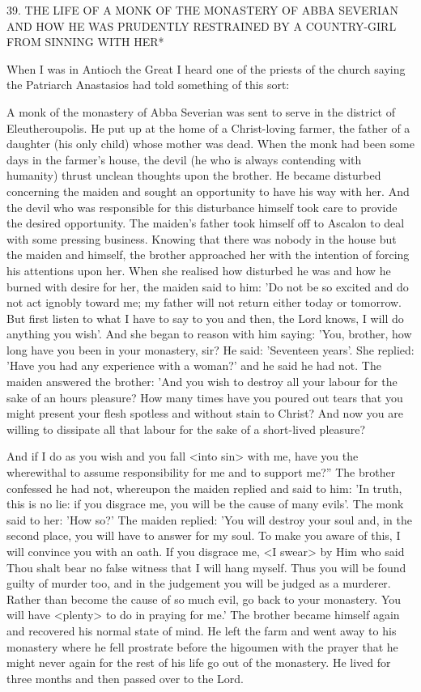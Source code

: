 39.
THE LIFE OF A MONK OF THE MONASTERY OF
ABBA SEVERIAN AND HOW HE WAS PRUDENTLY
RESTRAINED BY A COUNTRY-GIRL
FROM SINNING WITH HER*

When I was in Antioch the Great I heard one of the priests of the
church saying the Patriarch Anastasios had told something of this
sort:

A monk of the monastery of Abba Severian was sent to serve in the
district of Eleutheroupolis.
He put up at the home of a Christ-loving
farmer, the father of a daughter (his only child) whose mother was
dead.
When the monk had been some days in the farmer's house,
the devil (he who is always contending with humanity) thrust
unclean thoughts upon the brother.
He became disturbed concerning
the maiden and sought an opportunity to have his way with her.
And the devil who was responsible for this disturbance himself took
care to provide the desired opportunity.
The maiden's father took
himself off to Ascalon to deal with some pressing business.
Knowing
that there was nobody in the house but the maiden and himself, the
brother approached her with the intention of forcing his attentions
upon her.
When she realised how disturbed he was and how he
burned with desire for her, the maiden said to him: 'Do not be so
excited and do not act ignobly toward me; my father will not return
either today or tomorrow.
But first listen to what I have to say to
you and then, the Lord knows, I will do anything you wish'.
And
she began to reason with him saying: 'You, brother, how long have
you been in your monastery, sir? He said: 'Seventeen years'.
She
replied: 'Have you had any experience with a woman?' and he said
he had not.
The maiden answered the brother: 'And you wish to
destroy all your labour for the sake of an hour\textquotesingle s pleasure? How
many times have you poured out tears that you might present your
flesh spotless and without stain to Christ? And now you are willing
to dissipate all that labour for the sake of a short-lived pleasure?

And if I do as you wish and you fall <into sin> with me, have you
the wherewithal to assume responsibility for me and to support me?”
The brother confessed he had not, whereupon the maiden replied
and said to him: 'In truth, this is no lie: if you disgrace me, you will
be the cause of many evils'.
The monk said to her: 'How so?' The
maiden replied: 'You will destroy your soul and, in the second
place, you will have to answer for my soul.
To make you aware of
this, I will convince you with an oath.
If you disgrace me, <I
swear> by Him who said Thou shalt bear no false witness that I will
hang myself.
Thus you will be found guilty of murder too, and in
the judgement you will be judged as a murderer.
Rather than
become the cause of so much evil, go back to your monastery.
You
will have <plenty> to do in praying for me.' The brother became
himself again and recovered his normal state of mind.
He left the
farm and went away to his monastery where he fell prostrate before
the higoumen with the prayer that he might never again for the rest
of his life go out of the monastery.
He lived for three months and
then passed over to the Lord.

